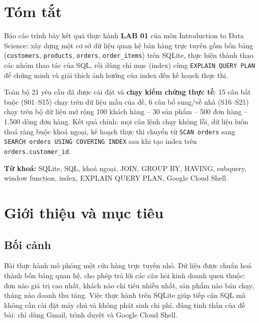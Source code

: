 \documentclass[12pt,a4paper]{article}
\newcommand{\code}[1]{\texttt{\small #1}}
\begin{document}
\section*{Tóm tắt}

Báo cáo trình bày kết quả thực hành \textbf{LAB 01} của môn Introduction to Data Science: xây
dựng một cơ sở dữ liệu quan hệ bán hàng trực tuyến gồm bốn bảng
(\code{customers}, \code{products}, \code{orders}, \code{order\_items}) trên SQLite, thực hiện
thành thạo các nhóm thao tác của SQL, rồi dùng chỉ mục (index) cùng
\code{EXPLAIN QUERY PLAN} để chứng minh và giải thích ảnh hưởng của index đến kế hoạch
thực thi.

Toàn bộ 21 yêu cầu đã được cài đặt và \textbf{chạy kiểm chứng thực tế}: 15 câu bắt buộc
(S01--S15) chạy trên dữ liệu mẫu của đề, 6 câu bổ sung/về nhà (S16--S21) chạy trên bộ dữ liệu
mở rộng 100 khách hàng -- 30 sản phẩm -- 500 đơn hàng -- 1.500 dòng đơn hàng. Kết quả chính:
mọi câu lệnh chạy không lỗi, dữ liệu luôn thoả ràng buộc khoá ngoại, kế hoạch thực thi chuyển
từ \code{SCAN orders} sang \code{SEARCH orders USING COVERING INDEX} sau khi tạo index trên
\code{orders.customer\_id}.

\vspace{0.4cm}
\noindent\textbf{Từ khoá:} SQLite, SQL, khoá ngoại, JOIN, GROUP BY, HAVING, subquery,
window function, index, EXPLAIN QUERY PLAN, Google Cloud Shell.

\clearpage
\tableofcontents
\clearpage

\section{Giới thiệu và mục tiêu}

\subsection{Bối cảnh}

Bài thực hành mô phỏng một cửa hàng trực tuyến nhỏ. Dữ liệu được chuẩn hoá thành bốn bảng quan
hệ, cho phép trả lời các câu hỏi kinh doanh quen thuộc: đơn nào giá trị cao nhất, khách nào chi
tiêu nhiều nhất, sản phẩm nào bán chạy, tháng nào doanh thu tăng. Việc thực hành trên SQLite
giúp tiếp cận SQL mà không cần cài đặt máy chủ và không phát sinh chi phí, đúng tinh thần của
đề bài: chỉ dùng Gmail, trình duyệt và Google Cloud Shell.
\end{document}
